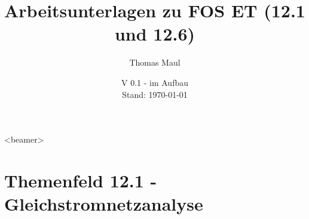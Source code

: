 \documentclass[aspectratio=169, ignorenonframetext]{beamer}
\author{Thomas Maul}
\title{Arbeitsunterlagen zu FOS ET (12.1 und 12.6)}
\date{V 0.1 - im Aufbau\\ Stand: \today}%
\institute[BWS Hofheim]{Brühlwiesenschule, Hofheim}
\begin{document}
\begin{frame}<beamer>
\titlepage
\end{frame}

\part{Themenfeld 12.1 - Gleichstromnetzanalyse}
\begin{frame}
  \partpage
\end{frame}
\end{document}
